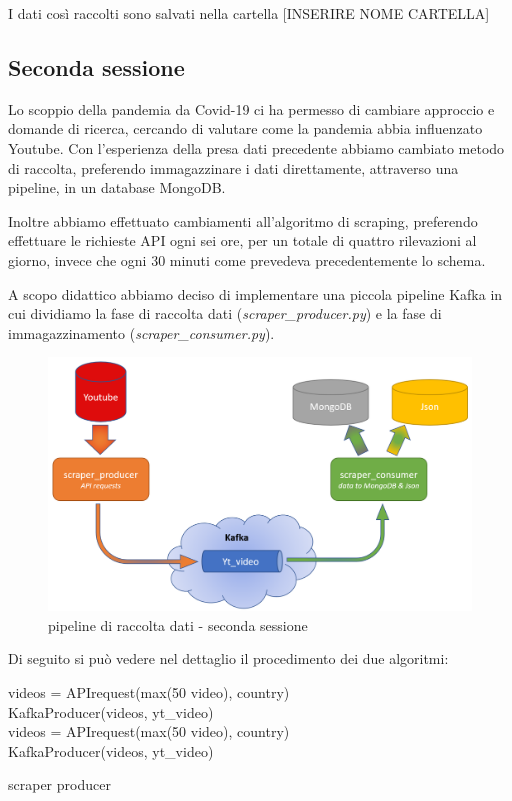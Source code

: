 I dati così raccolti sono salvati nella cartella [INSERIRE NOME CARTELLA]

\subsection*{Seconda sessione}

Lo scoppio della pandemia da Covid-19 ci ha permesso di cambiare approccio e domande di ricerca, cercando di valutare come la pandemia abbia influenzato Youtube. Con l'esperienza della presa dati precedente abbiamo cambiato metodo di raccolta, preferendo immagazzinare i dati direttamente, attraverso una pipeline, in un database MongoDB.

Inoltre abbiamo effettuato cambiamenti all'algoritmo di scraping, preferendo effettuare le richieste API ogni sei ore, per un totale di quattro rilevazioni al giorno, invece che ogni 30 minuti come prevedeva precedentemente lo schema.

A scopo didattico abbiamo deciso di implementare una piccola pipeline Kafka in cui dividiamo la fase di raccolta dati (\textit{scraper\_producer.py}) e la fase di immagazzinamento (\textit{scraper\_consumer.py}). 

\begin{figure}[H]
	\centering
	\includegraphics[width=0.8\linewidth]{pics/pipeline.png}
	\caption{pipeline di raccolta dati - seconda sessione}
\end{figure}

Di seguito si può vedere nel dettaglio il procedimento dei due algoritmi:

\begin{algorithm}[H]
	\nl {} {
		\nl {}
		{
			\nl videos = APIrequest(max(50 video), country)\\
			\nl KafkaProducer(videos, yt\_video) \\ 
			\nl {}
			{
				\nl videos = APIrequest(max(50 video), country) \\
				\nl KafkaProducer(videos, yt\_video) \\
			}
		}
	}
	\caption{scraper producer}
\end{algorithm}

